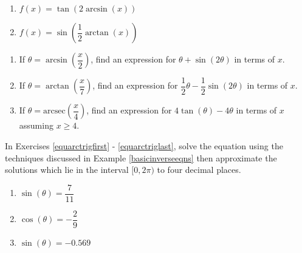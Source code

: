 \begin{multicols}{2}

\begin{enumerate}

\setcounter{enumi}{\value{HW}}

\item $f(x) = \tan \left( 2\arcsin(x) \right)$ 
\item $f(x) = \sin \left( \dfrac{1}{2}\arctan(x) \right)$  \label{rewritelast}

\setcounter{HW}{\value{enumi}}

\end{enumerate}

\end{multicols}

\begin{enumerate}

\setcounter{enumi}{\value{HW}}

\item If $\theta = \arcsin\left(\dfrac{x}{2}\right)$,  find an expression for $\theta + \sin(2\theta)$ in terms of $x$.

\item If $\theta = \arctan\left(\dfrac{x}{7}\right)$, find an expression for $\dfrac{1}{2}\theta - \dfrac{1}{2}\sin(2\theta)$ in terms of $x$.

\item If $\theta = \mbox{arcsec}\left(\dfrac{x}{4}\right)$,  find an expression for $4\tan(\theta) - 4\theta$ in terms of $x$ assuming $x \geq 4$.

\setcounter{HW}{\value{enumi}}

\end{enumerate}

In Exercises \ref{equarctrigfirst} - \ref{equarctriglast}, solve the equation using the techniques discussed in Example \ref{basicinverseeqns} then approximate the solutions which lie in the interval $[0, 2\pi)$ to four decimal places.

\begin{multicols}{3}

\begin{enumerate}

\setcounter{enumi}{\value{HW}}

\item $\sin(\theta) = \dfrac{7}{11}$ \label{equarctrigfirst}
\item $\cos(\theta) = -\dfrac{2}{9}$
\item $\sin(\theta) = -0.569$ 

\setcounter{HW}{\value{enumi}}

\end{enumerate}

\end{multicols}


